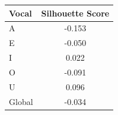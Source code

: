 \begin{tabular}{lc}
\toprule
\rowcolor{col01}
Vocal & Silhouette Score \\
\midrule
A & -0.153 \\
E & -0.050 \\
I & 0.022 \\
O & -0.091 \\
U & 0.096 \\
Global & -0.034 \\
\bottomrule
\end{tabular}
